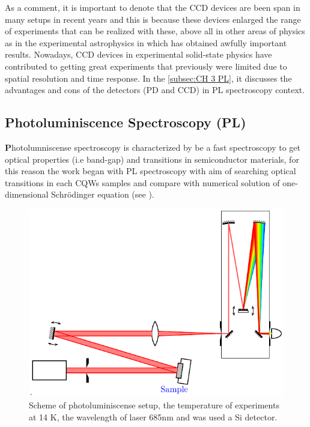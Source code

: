 As a comment, it is important to denote that the CCD devices are been span in many setups in recent years and this is because these devices enlarged the range of experiments that can be realized with these, above all in other areas of physics as in the experimental astrophysics in which has obtained awfully important results.  Nowadays, CCD devices in experimental solid-state physics have contributed to getting great experiments that previously were limited due to spatial resolution and time response.  In the \cref{subsec:CH 3 PL}, it discusses the advantages and cons of the detectors (PD and CCD)  in PL spectroscopy context. 


\subsection{Photoluminiscence Spectroscopy (PL)}
\label{subsec:chapter-3-pl}
\vspace{-10mm}
\lettrine[lines=3, lraise=.1, nindent=0mm, slope=0mm]{\textbf{P}}{}hotolumniscense spectroscopy is characterized by be a fast spectroscopy to get optical properties (i.e band-gap) and transitions in  semiconductor materials, for this reason the work began with PL spectroscopy with aim of searching optical transitions in each CQWs samples and compare with  numerical solution of one-dimensional Schr\"odinger equation (see ). 
\begin{figure}
	\centering
	\includegraphics[width=\textwidth]{../figures/chapter-3/pl-setup/build/pl-setup}
	\caption[PL Scheme]{Scheme of photoluminiscense setup, the temperature of experiments  at 14 K, the wavelength of laser  685nm and was used a Si detector. }
	\label{fig:chapter-3 subsec 3.2.1 PL setup}
\end{figure}
 
